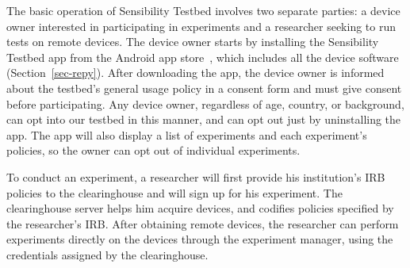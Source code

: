 The basic operation of Sensibility Testbed involves two separate 
parties: a device owner interested in participating in experiments 
and a researcher seeking to run tests on remote devices. The 
device owner starts by installing the Sensibility Testbed app from 
the Android app store~\cite{sensibility-app}, which includes all the 
device software (Section~\ref{sec-repy}). After downloading the app, 
the device owner is informed about the testbed's general usage policy 
in a consent form and must give consent before participating.
Any device owner, regardless of age, country, or background, can 
opt into our testbed in this manner, and can opt out just by uninstalling 
the app. The app will also display a list of experiments and each 
experiment's policies, so the owner can opt out of individual experiments. 

To conduct an experiment, a researcher will first provide his institution's 
IRB policies to the clearinghouse and will sign up for his experiment.  
The clearinghouse server helps him acquire devices, and codifies 
policies specified by the researcher's IRB. After obtaining remote devices, 
the researcher can perform experiments directly on the devices through 
the experiment manager, using the credentials assigned by the clearinghouse. 





